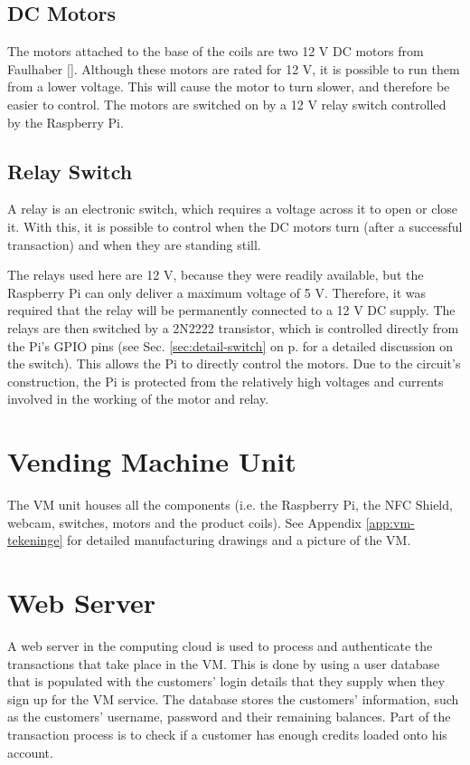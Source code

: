 \subsection{DC Motors}
\label{sec:dc-motor}

The motors attached to the base of the coils are two 12 V DC motors from Faulhaber
[\cite{manual:dc-motors}]. Although these motors are rated for 12 V, it is possible to run them
from a lower voltage. This will cause the motor to turn slower, and therefore be easier to
control. The motors are switched on by a 12 V relay switch controlled by the Raspberry Pi.

\subsection{Relay Switch}
\label{sec:relay-switch}

A relay is an electronic switch, which requires a voltage across it to open or close it.
With this, it is possible to control when the DC motors turn (after a successful
transaction) and when they are standing still.

The relays used here are 12 V, because they were readily available, but the
Raspberry Pi can only deliver a maximum voltage of 5 V. Therefore, it was required that the
relay will be permanently connected to a 12 V DC supply. The relays are then switched by a
2N2222 transistor, which is controlled directly from the Pi's GPIO pins (see Sec.
\ref{sec:detail-switch} on p.\pageref{sec:detail-switch} for a detailed discussion on the
switch). This allows the Pi to directly control the motors. Due to the circuit's
construction, the Pi is protected from the relatively high voltages and currents involved
in the working of the motor and relay.

\section{Vending Machine Unit}

The VM unit houses all the components (i.e. the Raspberry Pi, the NFC Shield,
webcam, switches, motors and the product coils). See Appendix \ref{app:vm-tekeninge} 
for detailed manufacturing drawings and a picture of the VM.

\section{Web Server}

A web server in the computing cloud is used to process and authenticate the
transactions that take place in the VM. This is done by
using a user database that is populated with the customers' login details that
they supply when they sign up for the VM service. The database
stores the customers' information, such as the customers' username, password and their
remaining balances. Part of the transaction process is to check if a customer has enough
credits loaded onto his account.

